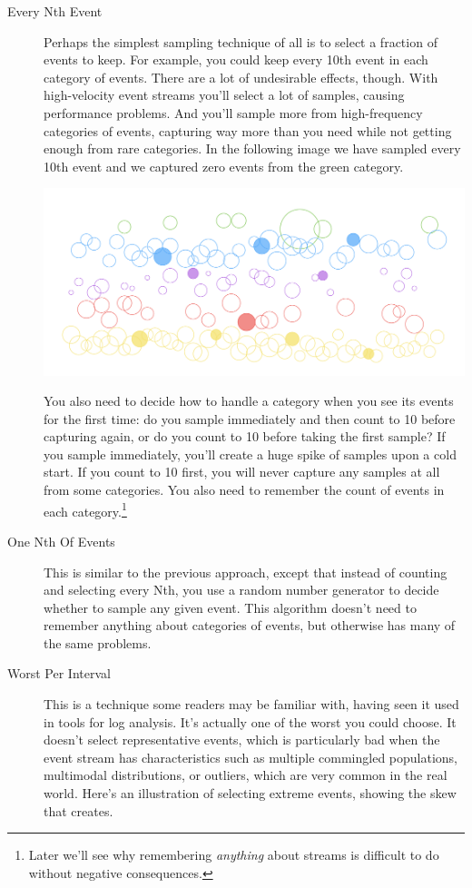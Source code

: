\documentclass{vivid_layout}
\begin{document}
\begin{description}

\item[Every Nth Event] Perhaps the simplest sampling technique of all is to
select a fraction of events to keep. For example, you could keep every 10th
event in each category of events. There are a lot of undesirable effects,
though. With high-velocity event streams you'll select a lot of samples, causing
performance problems. And you'll sample more from high-frequency categories of
events, capturing way more than you need while not getting enough from rare
categories. In the following image we have sampled every 10th event and we
captured zero events from the green category.

\begin{center}
\includegraphics[width=\linewidth]{sketch-sampling/select-every-10th}
\end{center}

You also need to decide how to handle a category when you see its
events for the first time: do you sample immediately and then count to 10 before
capturing again, or do you count to 10 before taking the first sample? If you
sample immediately, you'll create a huge spike of samples upon a cold start. If
you count to 10 first, you will never capture any samples at all from some
categories. You also need to remember the count of events in each
category.\footnote{Later we'll see why remembering \emph{anything} about
streams is difficult to do without negative consequences.}

\item[One Nth Of Events] This is similar to the previous approach, except that
instead of counting and selecting every Nth, you use a random number generator
to decide whether to sample any given event.  This algorithm doesn't need to
remember anything about categories of events, but otherwise has many of the same
problems.

\item[Worst Per Interval] This is a technique some readers may be familiar
with, having seen it used in tools for log analysis. It's actually one of the
worst you could choose. It doesn't select representative events, which is
particularly bad when the event stream has characteristics such as multiple
commingled populations, multimodal distributions, or outliers, which are very
common in the real world. Here's an illustration of selecting extreme events,
showing the skew that creates.


\end{description}
\end{document}
